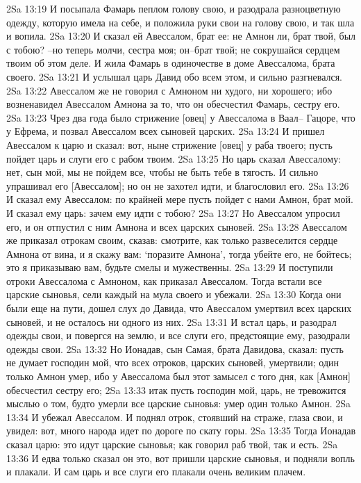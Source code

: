 2Sa 13:19  И посыпала Фамарь пеплом голову свою, и разодрала разноцветную одежду, которую имела на себе, и положила руки свои на голову свою, и так шла и вопила.
2Sa 13:20  И сказал ей Авессалом, брат ее: не Амнон ли, брат твой, был с тобою? --но теперь молчи, сестра моя; он--брат твой; не сокрушайся сердцем твоим об этом деле. И жила Фамарь в одиночестве в доме Авессалома, брата своего.
2Sa 13:21  И услышал царь Давид обо всем этом, и сильно разгневался.
2Sa 13:22  Авессалом же не говорил с Амноном ни худого, ни хорошего; ибо возненавидел Авессалом Амнона за то, что он обесчестил Фамарь, сестру его.
2Sa 13:23  Чрез два года было стрижение [овец] у Авессалома в Ваал-- Гацоре, что у Ефрема, и позвал Авессалом всех сыновей царских.
2Sa 13:24  И пришел Авессалом к царю и сказал: вот, ныне стрижение [овец] у раба твоего; пусть пойдет царь и слуги его с рабом твоим.
2Sa 13:25  Но царь сказал Авессалому: нет, сын мой, мы не пойдем все, чтобы не быть тебе в тягость. И сильно упрашивал его [Авессалом]; но он не захотел идти, и благословил его.
2Sa 13:26  И сказал ему Авессалом: по крайней мере пусть пойдет с нами Амнон, брат мой. И сказал ему царь: зачем ему идти с тобою?
2Sa 13:27  Но Авессалом упросил его, и он отпустил с ним Амнона и всех царских сыновей.
2Sa 13:28  Авессалом же приказал отрокам своим, сказав: смотрите, как только развеселится сердце Амнона от вина, и я скажу вам: `поразите Амнона', тогда убейте его, не бойтесь; это я приказываю вам, будьте смелы и мужественны.
2Sa 13:29  И поступили отроки Авессалома с Амноном, как приказал Авессалом. Тогда встали все царские сыновья, сели каждый на мула своего и убежали.
2Sa 13:30  Когда они были еще на пути, дошел слух до Давида, что Авессалом умертвил всех царских сыновей, и не осталось ни одного из них.
2Sa 13:31  И встал царь, и разодрал одежды свои, и повергся на землю, и все слуги его, предстоящие ему, разодрали одежды свои.
2Sa 13:32  Но Ионадав, сын Самая, брата Давидова, сказал: пусть не думает господин мой, что всех отроков, царских сыновей, умертвили; один только Амнон умер, ибо у Авессалома был этот замысел с того дня, как [Амнон] обесчестил сестру его;
2Sa 13:33  итак пусть господин мой, царь, не тревожится мыслью о том, будто умерли все царские сыновья: умер один только Амнон.
2Sa 13:34  И убежал Авессалом. И поднял отрок, стоявший на страже, глаза свои, и увидел: вот, много народа идет по дороге по скату горы.
2Sa 13:35  Тогда Ионадав сказал царю: это идут царские сыновья; как говорил раб твой, так и есть.
2Sa 13:36  И едва только сказал он это, вот пришли царские сыновья, и подняли вопль и плакали. И сам царь и все слуги его плакали очень великим плачем.
